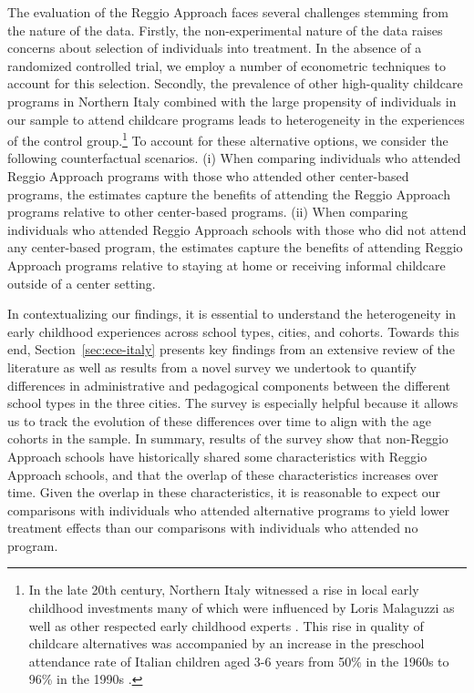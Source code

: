 The evaluation of the Reggio Approach faces several challenges stemming from the nature of the data. Firstly, the non-experimental nature of the data raises concerns about selection of individuals into treatment. In the absence of a randomized controlled trial, we employ a number of econometric techniques to account for this selection. Secondly, the prevalence of other high-quality childcare programs in Northern Italy combined with the large propensity of individuals in our sample to attend childcare programs leads to heterogeneity in the experiences of the control group.\footnote{In the late 20th century, Northern Italy witnessed a rise in local early childhood investments many of which were influenced by Loris Malaguzzi as well as other respected early childhood experts \citep{OECD_2001_Italy-Country-Note}. This rise in quality of childcare alternatives was accompanied by an increase in the preschool attendance rate of Italian children aged 3-6 years from 50\% in the 1960s to 96\% in the 1990s \citep{Hohnerlein_2015_Development-and-Diffusion}.} To account for these alternative options, we consider the following counterfactual scenarios. (i) When comparing individuals who attended Reggio Approach programs with those who attended other center-based programs, the estimates capture the benefits of attending the Reggio Approach programs relative to other center-based programs. (ii) When comparing individuals who attended Reggio Approach schools with those who did not attend any center-based program, the estimates capture the benefits of attending Reggio Approach programs relative to staying at home or receiving informal childcare outside of a center setting.

In contextualizing our findings, it is essential to understand the heterogeneity in early childhood experiences across school types, cities, and cohorts. Towards this end, Section~\ref{sec:ece-italy} presents key findings from an extensive review of the literature as well as results from a novel survey we undertook to quantify differences in administrative and pedagogical components between the different school types in the three cities. The survey is especially helpful because it allows us to track the evolution of these differences over time to align with the age cohorts in the sample. In summary, results of the survey show that non-Reggio Approach schools have historically shared some characteristics with Reggio Approach schools, and that the overlap of these characteristics increases over time. Given the overlap in these characteristics, it is reasonable to expect our comparisons with individuals who attended alternative programs to yield lower treatment effects than our comparisons with individuals who attended no program.

